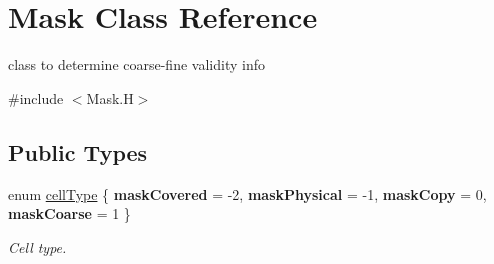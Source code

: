 \hypertarget{class_mask}{}\section{Mask Class Reference}
\label{class_mask}


class to determine coarse-\/fine validity info  




{\ttfamily \#include $<$Mask.\+H$>$}

\subsection*{Public Types}
\begin{DoxyCompactItemize}
\item 
\mbox{\label{class_mask_a81350474ba1eed5e378837d0772d86c2}} 
enum \hyperlink{class_mask_a81350474ba1eed5e378837d0772d86c2}{cell\+Type} \{ {\bfseries mask\+Covered} = -\/2, 
{\bfseries mask\+Physical} = -\/1, 
{\bfseries mask\+Copy} = 0, 
{\bfseries mask\+Coarse} = 1
 \}\begin{DoxyCompactList}\small\item\em Cell type. \end{DoxyCompactList}
\end{DoxyCompactItemize}
